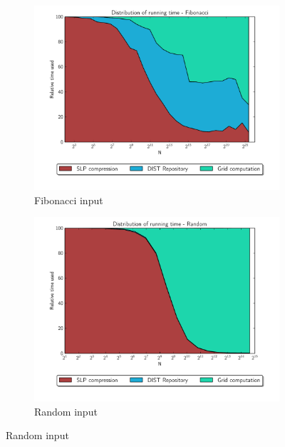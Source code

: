 \documentclass[twoside,11pt,openright]{report}
\begin{document}
\begin{figure}[!ht]
  \centering
  \begin{subfigure}{0.49\textwidth}
    \centering
    \includegraphics[width=\textwidth]{combined/fib_area_plot}
    \caption{Fibonacci input}
    \label{fig:benchmark:relative-runningtime-fib}
  \end{subfigure}
  \begin{subfigure}{0.49\textwidth}
    \centering
    \includegraphics[width=\textwidth]{combined/random_area_plot}
    \caption{Random input}
    \label{fig:benchmark:relative-runningtime-random}
  \end{subfigure}


\end{figure}
\end{document}
